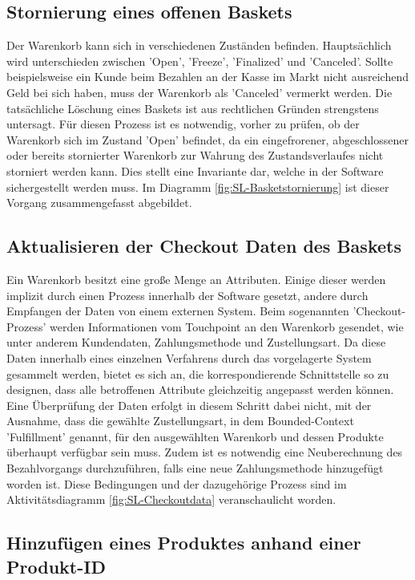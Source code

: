 \subsection{Stornierung eines offenen Baskets}

Der Warenkorb kann sich in verschiedenen Zuständen befinden. Hauptsächlich wird unterschieden zwischen 'Open', 'Freeze', 'Finalized' und 'Canceled'. Sollte beispielsweise ein Kunde beim Bezahlen an der Kasse im Markt nicht ausreichend Geld bei sich haben, muss der Warenkorb als 'Canceled' vermerkt werden. Die tatsächliche Löschung eines Baskets ist aus rechtlichen Gründen strengstens untersagt. Für diesen Prozess ist es notwendig, vorher zu prüfen, ob der Warenkorb sich im Zustand 'Open' befindet, da ein eingefrorener, abgeschlossener oder bereits stornierter Warenkorb zur Wahrung des Zustandsverlaufes nicht storniert werden kann. Dies stellt eine Invariante dar, welche in der Software sichergestellt werden muss. Im Diagramm \ref{fig:SL-Basketstornierung} ist dieser Vorgang zusammengefasst abgebildet.

\subsection{Aktualisieren der Checkout Daten des Baskets}

Ein Warenkorb besitzt eine große Menge an Attributen. Einige dieser werden implizit durch einen Prozess innerhalb der Software gesetzt, andere durch Empfangen der Daten von einem externen System. Beim sogenannten 'Checkout-Prozess' werden Informationen vom Touchpoint an den Warenkorb gesendet, wie unter anderem Kundendaten, Zahlungsmethode und Zustellungsart. Da diese Daten innerhalb eines einzelnen Verfahrens durch das vorgelagerte System gesammelt werden, bietet es sich an, die korrespondierende Schnittstelle so zu designen, dass alle betroffenen Attribute gleichzeitig angepasst werden können. Eine Überprüfung der Daten erfolgt in diesem Schritt dabei nicht, mit der Ausnahme, dass die gewählte Zustellungsart, in dem Bounded-Context 'Fulfillment' genannt, für den ausgewählten Warenkorb und dessen Produkte überhaupt verfügbar sein muss. Zudem ist es notwendig eine Neuberechnung des Bezahlvorgangs durchzuführen, falls eine neue Zahlungsmethode hinzugefügt worden ist. Diese Bedingungen und der dazugehörige Prozess sind im Aktivitätsdiagramm \ref{fig:SL-Checkoutdata} veranschaulicht worden.

\subsection{Hinzufügen eines Produktes anhand einer Produkt-ID}

